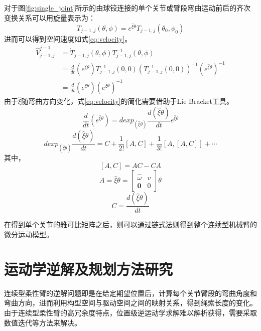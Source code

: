 	对于图\ref{fig:single_joint}所示的由球铰连接的单个关节或臂段弯曲运动前后的齐次变换关系可以用旋量表示为：
	\begin{equation}
	T_{j-1, j} (\theta, \phi)= e^{\hat{\xi} \theta} T_{j-1, j}(\theta_0, \phi_0)
	\label{eq:ex_trans}
	\end{equation}
	进而可以得到空间速度如式\ref{eq:velocity}。
	\begin{equation}
	\begin{aligned}
	\hat{V}_{j-1,j}^{j-1} &= \dot{T}_{j-1,j}(\theta,\phi) {T}^{-1}_{j-1,j}(\theta,\phi)\\
	&=\frac{d}{dt}(e^{\hat{\xi} \theta}) T^{-1}_{j-1,j}(0,0) (T^{-1}_{j-1,j}(0,0))^{-1} (e^{\hat{\xi} \theta})^{-1}\\
	&=\frac{d}{dt}(e^{\hat{\xi} \theta})(e^{\hat{\xi} \theta})^{-1}
	\end{aligned}
	\label{eq:velocity}
	\end{equation}
	由于$\hat{\xi}$随弯曲方向变化，式\ref{eq:velocity}的简化需要借助于Lie Bracket工具。
	\begin{equation}
	\frac{d}{dt}(e^{\hat{\xi} \theta}) = dexp_{(\hat{\xi}\theta)} \frac{d(\hat{\xi}\theta)}{dt} e^{\hat{\xi} \theta}
	\label{eq:dexp}
	\end{equation}
	\begin{equation}
	dexp_{(\hat{\xi}\theta)} \frac{d(\hat{\xi}\theta)}{dt} = C + \frac{1}{2!}[A, C] + \frac{1}{3!}[A, [A, C]] + \cdots
	\label{eq:liebracket}
	\end{equation}
	其中，
	$$ [A, C] = AC-CA $$
	$$ A= \hat{\xi}\theta = \begin{bmatrix}
	\hat{\omega} & v \\
	\mathbf{0} & 0
	\end{bmatrix} \theta $$
	$$ C = \frac{d(\hat{\xi}\theta)}{dt}$$
	
	在得到单个关节的雅可比矩阵之后，则可以通过链式法则得到整个连续型机械臂的微分运动模型。
	

\section{运动学逆解及规划方法研究}
连续型柔性臂的逆解问题即是在给定期望位置后，计算每个关节臂段的弯曲角度和弯曲方向，进而利用构型空间与驱动空间之间的映射关系，得到绳索长度的变化。由于连续型柔性臂的高冗余度特点，位置级逆运动学求解难以解析获得，需要采取数值迭代等方法来解决。
